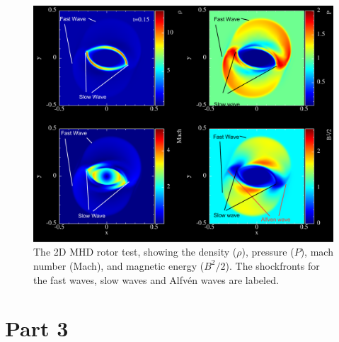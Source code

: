 \documentclass{article}
\begin{document}
\begin{figure}[h!]
    \centering
    \includegraphics[width=\linewidth]{2b_annotated.pdf}
    \caption{The 2D MHD rotor test, showing the density ($\rho$), pressure
    ($P$), mach number (Mach), and magnetic energy ($B^2/2$). The shockfronts
    for the fast waves, slow waves and Alfv\'en waves are labeled.}
    \label{fig:2b}
\end{figure}

\section*{Part 3}
\end{document}
